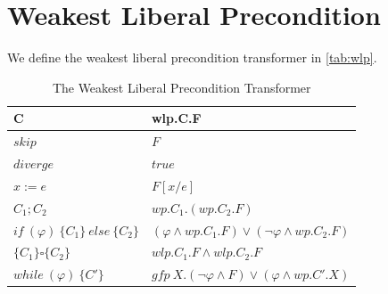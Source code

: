 \section{Weakest Liberal Precondition}
We define the weakest liberal precondition transformer in \autoref{tab:wlp}. 
\begin{table}[h!]\centering
    \begin{tabular}{ll}
    \hline\hline
      \textbf{C}&\textbf{wlp.C.F}    \\ \hline
      $skip$&   $F$   \\
      $diverge$&  $true$\\
      $x:= e $&  $F[x/e]$\\
      $C_1;C_2$&  $wp.C_1.(wp.C_2.F)$\\
      $if\ (\varphi)\ \{C_1\}\ else\ \{C_2\} $&  $(\varphi\wedge wp.C_1.F)\vee(\neg\varphi\wedge wp.C_2.F)$\\
      $\{C_1\}\square \{C_2\}$ & $wlp.C_1.F\wedge wlp.C_2.F$\\
      $while\ (\varphi)\ \{C'\}$&  $gfp\ X.(\neg\varphi\wedge F)\vee(\varphi\wedge wp.C'.X)$\\
      \hline\hline
    \end{tabular}
    \caption{The Weakest Liberal Precondition Transformer}
    \label{tab:wlp}
\end{table}

